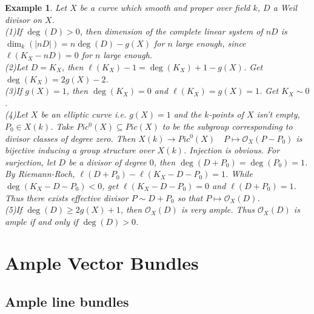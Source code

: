 \documentclass{ctexart}
\newtheorem{example}{Example}[section]
\begin{document}
\begin{example}
    Let $X$ be a curve which smooth and proper over field $k$, $D$ a Weil divisor on $X$. \\
    (1)If $\deg(D) > 0$, then dimension of the complete linear system of $nD$ is $\dim_{k}(|nD|) = n\deg(D) - g(X)$ for $n$ large enough,
    since $\ell(K_{X} - nD) = 0$ for $n$ large enough. \\
    (2)Let $D = K_{X}$, then $\ell(K_{X}) - 1 = \deg(K_{X}) + 1 - g(X)$.
    Get $\deg(K_{X}) = 2g(X) - 2$. \\
    (3)If $g(X) = 1$, then $\deg(K_{X}) = 0$ and $\ell(K_{X}) = g(X) = 1$.
    Get $K_{X} \sim 0$. \\
    (4)Let $X$ be an elliptic curve i.e. $g(X) = 1$ and the $k$-points of $X$ isn't empty, $P_{0}\in X(k)$.
    Take $Pic^{0}(X) \subseteq Pic(X)$ to be the subgroup corresponding to divisor classes of degree zero.
    Then $X(k) \longrightarrow Pic^{0}(X)\quad P \longmapsto \mathcal{O}_{X}(P - P_{0})$ is bijective inducing a group structure over $X(k)$.
    Injection is obvious.
    For surjection, let $D$ be a divisor of degree $0$, then $\deg(D + P_{0}) = \deg(P_{0}) = 1$.
    By Riemann-Roch, $\ell(D + P_{0}) - \ell(K_{X} - D - P_{0}) = 1$.
    While $\deg(K_{X} - D - P_{0}) < 0$, get $\ell(K_{X} - D - P_{0}) = 0$ and $\ell(D + P_{0}) = 1$.
    Thus there exists effective divisor $P \sim D + P_{0}$ so that $P \longmapsto \mathcal{O}_{X}(D)$. \\
    (5)If $\deg(D) \ge 2g(X) + 1$, then $\mathcal{O}_{X}(D)$ is very ample.
    Thus $\mathcal{O}_{X}(D)$ is ample if and only if $\deg(D) > 0$.
\end{example}

\section{Ample Vector Bundles}
\label{section:Ample_Vector_Bundles}

\subsection{Ample line bundles}
\label{subsection:Ample_Vector_Bundles_Ample_line_bundles}
\end{document}
